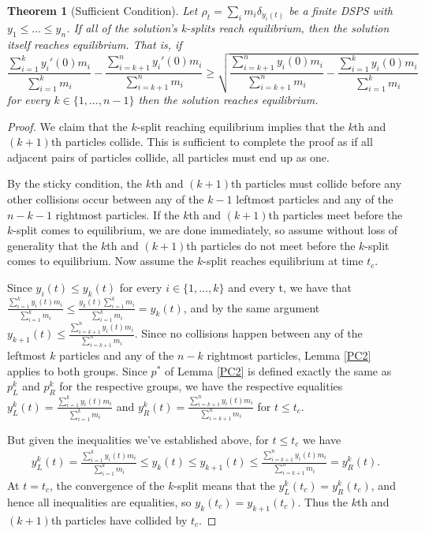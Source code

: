 \documentclass[11pt]{article}
\newtheorem{theorem}{Theorem}[section]
\numberwithin{equation}{section}
\begin{document}
        \begin{theorem}[Sufficient Condition]\label{discrete-sufficient}
            Let $\rho_t=\sum_i m_i\delta_{y_i(t)}$ be a finite DSPS with $y_1\leq\ldots\leq y_n$. If all of the solution's k-splits reach equilibrium, then the solution itself reaches equilibrium. That is, if $$\frac{\sum_{i=1}^ky_i'(0)m_i}{\sum_{i=1}^k m_i}-\frac{\sum_{i=k+1}^ny_i'(0)m_i}{\sum_{i=k+1}^n m_i}\geq\sqrt{\frac{\sum_{i=k+1}^ny_i(0)m_i}{\sum_{i=k+1}^n m_i}-\frac{\sum_{i=1}^k y_i(0)m_i}{\sum_{i=1}^k m_i}}$$ for every $k\in\{1,\ldots,n-1\}$ then the solution reaches equilibrium. 
        \end{theorem}

        \begin{proof}
        We claim that the $k$-split reaching equilibrium implies that the $k$th and $(k+1)$th particles collide. This is sufficient to complete the proof as if all adjacent pairs of particles collide, all particles must end up as one.

        
       By the sticky condition, the $k$th and $(k+1)$th particles must collide before any other collisions occur between any of the $k-1$ leftmost particles and any of the $n-k-1$ rightmost particles. If the $k$th and $(k+1)$th particles meet before the $k$-split comes to equilibrium, we are done immediately, so assume without loss of generality that the $k$th and $(k+1)$th particles do not meet before the $k$-split comes to equilibrium. Now assume the $k$-split reaches equilibrium at time $t_c$. 

        Since $y_i(t)\leq y_k(t)$ for every $i\in\{1,\ldots,k\}$ and every t, we have that $\frac{\sum _{i=1}^k y_i(t)m_i}{\sum _{i=1}^k m_i}\leq \frac{y_k(t)\sum _{i=1}^km_i}{\sum _{i=1}^km_i}=y_k(t)$, and by the same argument $y_{k+1}(t)\leq \frac{\sum_{i=k+1}^n y_i(t)m_i}{\sum_{i=k+1}^n m_i}$. Since no collisions happen between any of the leftmost $k$ particles and any of the $n-k$ rightmost particles, Lemma \ref{PC2} applies to both groups. Since $p^*$ of Lemma \ref{PC2} is defined exactly the same as $p_L^k$ and $p_R^k$ for the respective groups, we have the respective equalities $y_L^k(t)=\frac{\sum_{i=1}^ky_i(t)m_i}{\sum_{i=1}^km_i}$ and $y_R^k(t)=\frac{\sum_{i=k+1}^ny_i(t)m_i}{\sum_{i=k+1}^nm_i}$ for $t \le t_c$. 
        
        But given the inequalities we've established above, for $t \le t_c$ we have
        \begin{align*}
            y_L^k(t)=\frac{\sum_{i=1}^ky_i(t)m_i}{\sum_{i=1}^km_i}\leq y_k(t)\leq y_{k+1}(t)\leq \frac{\sum_{i=k+1}^ny_i(t)m_i}{\sum_{i=k+1}^nm_i}=y_R^k(t).
        \end{align*}
        At $t=t_c$, the convergence of the $k$-split means that the $y_L^k(t_c)=y_R^k(t_c)$, and hence all inequalities are equalities, so $y_k(t_c)=y_{k+1}(t_c)$. Thus the $k$th and $(k+1)$th particles have collided by $t_c$.
    \end{proof}
\end{document}
